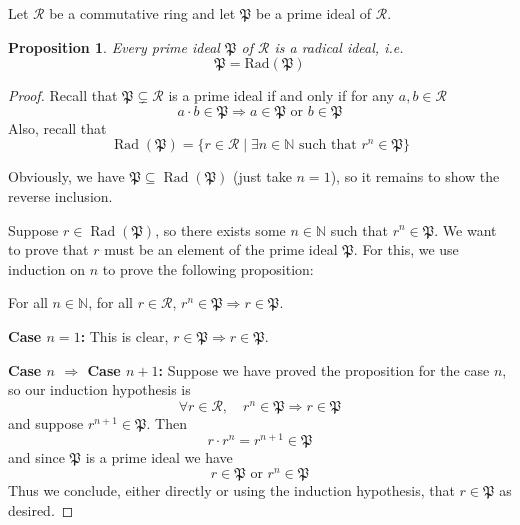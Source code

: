 \documentclass[12pt]{article}
\newtheorem{prop}{Proposition}
\newcommand{\Nats}{\mathbb{N}}
\begin{document}
Let $\mathcal{R}$ be a commutative ring and let $\mathfrak{P}$ be
a prime ideal of $\mathcal{R}$.

\begin{prop}
Every prime ideal $\mathfrak{P}$ of $\mathcal{R}$ is a radical
ideal, i.e.
$$\mathfrak{P}=\operatorname{Rad(\mathfrak{P})}$$
\end{prop}
\begin{proof}
Recall that $\mathfrak{P}\subsetneq \mathcal{R} $ is a prime ideal
if and only if for any $a,b\in \mathcal{R}$ $$a\cdot b\in
\mathfrak{P} \Rightarrow a\in \mathfrak{P} \text{ or } b\in
\mathfrak{P}$$ Also, recall that
$$\operatorname{Rad}(\mathfrak{P})=\{ r\in \mathcal{R} \mid
\exists n\in \Nats \text{ such that } r^n\in \mathfrak{P} \}$$

Obviously, we have $\mathfrak{P}\subseteq
\operatorname{Rad}(\mathfrak{P})$ (just take $n=1$), so it remains
to show the reverse inclusion.

Suppose $r\in \operatorname{Rad}(\mathfrak{P})$, so there exists
some $n\in \Nats$ such that $r^n\in \mathfrak{P}$. We want to
prove that $r$ must be an element of the prime ideal
$\mathfrak{P}$. For this, we use induction on $n$ to prove the
following proposition:

For all $n\in\Nats$, for all $r\in \mathcal{R}$,
$r^n\in\mathfrak{P} \Rightarrow r\in \mathfrak{P}$.

{\bf Case $n=1$:} This is clear, $r\in \mathfrak{P}
\Rightarrow r\in \mathfrak{P}$.

{\bf Case $n$ $\Rightarrow$ Case $n+1$: } Suppose we have proved
the proposition for the case $n$, so our induction hypothesis is
$$\forall r\in\mathcal{R}, \quad r^n\in\mathfrak{P} \Rightarrow r\in
\mathfrak{P}$$ and suppose $r^{n+1}\in \mathfrak{P}$. Then
$$r\cdot r^n = r^{n+1} \in \mathfrak{P}$$
and since $\mathfrak{P}$ is a prime ideal we have
$$r\in \mathfrak{P} \text{ or } r^n\in \mathfrak{P}$$
Thus we conclude, either directly or using the induction
hypothesis, that $r\in \mathfrak{P}$ as desired.

\end{proof}
\end{document}
